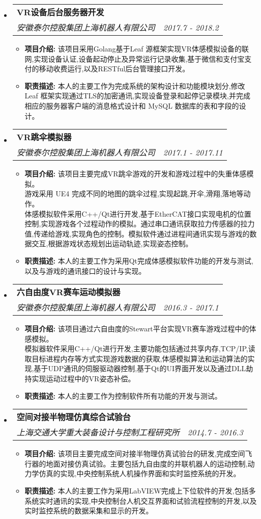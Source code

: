 \documentclass[letterpaper,11pt]{article}
\makeatletter
\newcommand{\resitem}[1]{\item #1 \vspace{-2pt}}
\newcommand{\ressubheading}[4]{
\begin{tabular*}{6.5in}{l@{\cftdotfill{\cftsecdotsep}\extracolsep{\fill}}r}
		\textbf{#1} & #2 \\
		\textit{#3} & \textit{#4} \\
\end{tabular*}\vspace{-6pt}}
\makeatother
\begin{document}
\begin{itemize}

\item
	\ressubheading{VR设备后台服务器开发}{}{安徽泰尔控股集团上海机器人有限公司}{2017.7 - 2018.2}
	\begin{itemize}
		\resitem{ {\bf 项目介绍:} 该项目采用Golang基于Leaf 源框架实现VR体感模拟设备的联网,实现设备认证,设备起动停止及异常运行记录收集,基于微信和支付宝支付的移动收费运行,以及RESTful后台管理接口开发。}
		\resitem{ {\bf 职责描述:} 本人的主要工作为完成系统的架构设计和功能模块划分,修改Leaf 框架实现通过TLS的加密通讯,实现设备登录和起停记录模块,并完成相应的服务器客户端的消息格式设计和 MySQL 数据库的表和字段的设计。}
	  \end{itemize}

\item
	\ressubheading{VR跳伞模拟器}{}{安徽泰尔控股集团上海机器人有限公司}{2017.1 - 2017.11}
	\begin{itemize}
		\resitem{ {\bf 项目介绍:} 该项目主要完成VR跳伞游戏的开发和游戏过程中的失重体感模拟。\\
		游戏采用 UE4 完成不同的地图的跳伞过程,实现起跳,开伞,滑翔,落地等动作。 \\
		体感模拟软件采用C++/Qt进行开发,基于EtherCAT接口实现电机的位置控制,实现游戏各个过程动作的模拟。通过串口通讯获取拉力传感器的拉力值,传递给游戏,实现角色的控制。模拟软件通过进程间通讯实现与游戏的数据交互,根据游戏状态规划出运动轨迹,实现姿态控制。}
		\resitem{ {\bf 职责描述:} 本人的主要工作为采用Qt完成体感模拟软件功能的开发与测试,以及与游戏的通讯接口的设计与实现。}
	\end{itemize}

\item
	\ressubheading{六自由度VR赛车运动模拟器}{}{安徽泰尔控股集团上海机器人有限公司}{2016.3 - 2017.1}
	\begin{itemize}
		\resitem{ {\bf 项目介绍:} 该项目通过六自由度的Stewart平台实现VR赛⻋游戏过程中的体感模拟。\\
		模拟器软件采用C++/Qt进行开发,主要功能包括通过共享内存,TCP/IP,读取目标进程内存等方式实现游戏数据的获取,体感模拟算法和运动算法的实现,基于UDP通讯的伺服驱动器控制,基于Qt的UI界面开发以及通过DLL劫持实现运动过程中的VR姿态补偿。}
		\resitem{ {\bf 职责描述:} 本人的主要工作为控制软件所有功能的开发与测试。}
	\end{itemize}

\item
	\ressubheading{空间对接半物理仿真综合试验台}{}{上海交通大学重大装备设计与控制工程研究所}{2014.7 - 2016.3}
	\begin{itemize}
		\resitem{ {\bf 项目介绍:} 该项目主要完成空间对接半物理仿真试验台的研发,完成空间⻜行器的地面对接仿真试验。主要包括九自由度的并联机器人的运动控制,动力学仿真的实现,中央控制系统人机操作界面和实时监控系统的开发。}
		\resitem{ {\bf 职责描述:} 本人的主要工作为采用LabVIEW完成上下位软件的开发,包括多系统实时通讯的实现,中央控制台人机交互界面和试验流程控制的开发,以及实时监控系统的数据采集和显示的开发。}
	\end{itemize}

\end{itemize}
\end{document}
